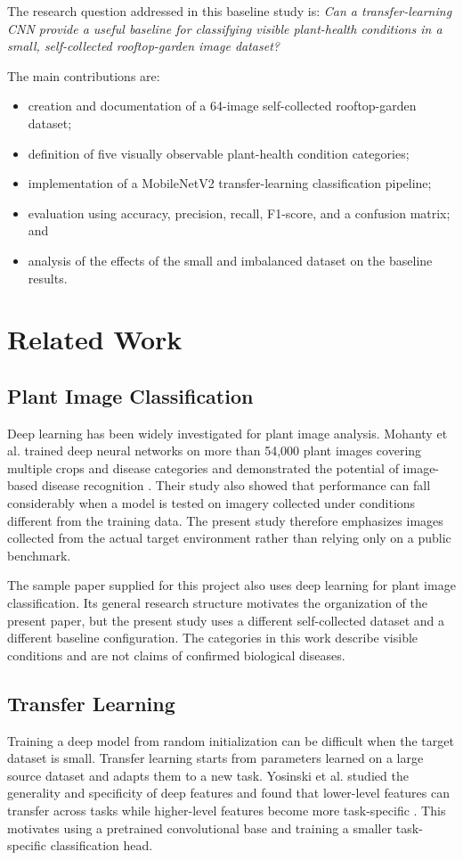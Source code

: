 \documentclass[conference]{IEEEtran}
\begin{document}
The research question addressed in this baseline study is: \emph{Can a transfer-learning CNN provide a useful baseline for classifying visible plant-health conditions in a small, self-collected rooftop-garden image dataset?}

The main contributions are:
\begin{itemize}
\item creation and documentation of a 64-image self-collected rooftop-garden dataset;
\item definition of five visually observable plant-health condition categories;
\item implementation of a MobileNetV2 transfer-learning classification pipeline;
\item evaluation using accuracy, precision, recall, F1-score, and a confusion matrix; and
\item analysis of the effects of the small and imbalanced dataset on the baseline results.
\end{itemize}

\section{Related Work}
\subsection{Plant Image Classification}
Deep learning has been widely investigated for plant image analysis. Mohanty et al. trained deep neural networks on more than 54,000 plant images covering multiple crops and disease categories and demonstrated the potential of image-based disease recognition \cite{mohanty2016}. Their study also showed that performance can fall considerably when a model is tested on imagery collected under conditions different from the training data. The present study therefore emphasizes images collected from the actual target environment rather than relying only on a public benchmark.

The sample paper supplied for this project also uses deep learning for plant image classification. Its general research structure motivates the organization of the present paper, but the present study uses a different self-collected dataset and a different baseline configuration. The categories in this work describe visible conditions and are not claims of confirmed biological diseases.

\subsection{Transfer Learning}
Training a deep model from random initialization can be difficult when the target dataset is small. Transfer learning starts from parameters learned on a large source dataset and adapts them to a new task. Yosinski et al. studied the generality and specificity of deep features and found that lower-level features can transfer across tasks while higher-level features become more task-specific \cite{yosinski2014}. This motivates using a pretrained convolutional base and training a smaller task-specific classification head.
\end{document}
